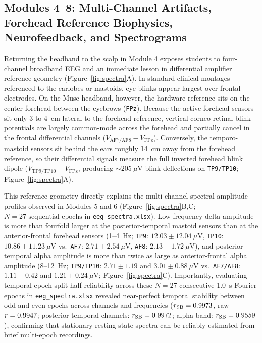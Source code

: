 \documentclass[11pt,letterpaper]{article}
\providecommand{\NSpectraEpochs}{27}
\providecommand{\ModSixDeltaTPNineMean}{12.03}
\providecommand{\ModSixDeltaTPNineSD}{12.04}
\providecommand{\ModSixDeltaTPTenMean}{10.86}
\providecommand{\ModSixDeltaTPTenSD}{11.23}
\providecommand{\ModSixDeltaAFSevenMean}{2.71}
\providecommand{\ModSixDeltaAFSevenSD}{2.54}
\providecommand{\ModSixDeltaAFEightMean}{2.13}
\providecommand{\ModSixDeltaAFEightSD}{1.72}
\providecommand{\ModSixAlphaTPNineMean}{2.71}
\providecommand{\ModSixAlphaTPNineSD}{1.19}
\providecommand{\ModSixAlphaTPTenMean}{3.01}
\providecommand{\ModSixAlphaTPTenSD}{0.88}
\providecommand{\ModSixAlphaAFSevenMean}{1.11}
\providecommand{\ModSixAlphaAFSevenSD}{0.42}
\providecommand{\ModSixAlphaAFEightMean}{1.21}
\providecommand{\ModSixAlphaAFEightSD}{0.24}
\begin{document}
\subsection{Modules 4--8: Multi-Channel Artifacts, Forehead Reference Biophysics, Neurofeedback, and Spectrograms}
Returning the headband to the scalp in Module 4 exposes students to four-channel broadband EEG and an immediate lesson in differential amplifier reference geometry (Figure~\ref{fig:spectra}A). In standard clinical montages referenced to the earlobes or mastoids, eye blinks appear largest over frontal electrodes. On the Muse headband, however, the hardware reference sits on the center forehead between the eyebrows (\texttt{FPz}). Because the active forehead sensors sit only 3 to 4~cm lateral to the forehead reference, vertical corneo-retinal blink potentials are largely common-mode across the forehead and partially cancel in the frontal differential channels ($V_{\text{AF7/AF8}} - V_{\text{FPz}}$). Conversely, the temporo-mastoid sensors sit behind the ears roughly 14~cm away from the forehead reference, so their differential signals measure the full inverted forehead blink dipole ($V_{\text{TP9/TP10}} - V_{\text{FPz}}$, producing $\sim 205\ \mu\text{V}$ blink deflections on \texttt{TP9/TP10}; Figure~\ref{fig:spectra}A).

This reference geometry directly explains the multi-channel spectral amplitude profiles observed in Modules 5 and 6 (Figure~\ref{fig:spectra}B,C; $N = \NSpectraEpochs\text{ sequential epochs}$ in \texttt{eeg\_spectra.xlsx}). Low-frequency delta amplitude is more than fourfold larger at the posterior-temporal mastoid sensors than at the anterior-frontal forehead sensors (1--4~Hz; \texttt{TP9}: $\ModSixDeltaTPNineMean \pm \ModSixDeltaTPNineSD\ \mu\text{V}$, \texttt{TP10}: $\ModSixDeltaTPTenMean \pm \ModSixDeltaTPTenSD\ \mu\text{V}$ vs.\ \texttt{AF7}: $\ModSixDeltaAFSevenMean \pm \ModSixDeltaAFSevenSD\ \mu\text{V}$, \texttt{AF8}: $\ModSixDeltaAFEightMean \pm \ModSixDeltaAFEightSD\ \mu\text{V}$), and posterior-temporal alpha amplitude is more than twice as large as anterior-frontal alpha amplitude (8--12~Hz; \texttt{TP9/TP10}: $\ModSixAlphaTPNineMean \pm \ModSixAlphaTPNineSD$ and $\ModSixAlphaTPTenMean \pm \ModSixAlphaTPTenSD\ \mu\text{V}$ vs.\ \texttt{AF7/AF8}: $\ModSixAlphaAFSevenMean \pm \ModSixAlphaAFSevenSD$ and $\ModSixAlphaAFEightMean \pm \ModSixAlphaAFEightSD\ \mu\text{V}$; Figure~\ref{fig:spectra}C). Importantly, evaluating temporal epoch split-half reliability across these $N = \NSpectraEpochs$ consecutive 1.0~s Fourier epochs in \texttt{eeg\_spectra.xlsx} revealed near-perfect temporal stability between odd and even epochs across channels and frequencies ($r_{\text{SB}} = 0.9973$, raw $r = 0.9947$; posterior-temporal channels: $r_{\text{SB}} = 0.9972$; alpha band: $r_{\text{SB}} = 0.9559$), confirming that stationary resting-state spectra can be reliably estimated from brief multi-epoch recordings.
\end{document}
